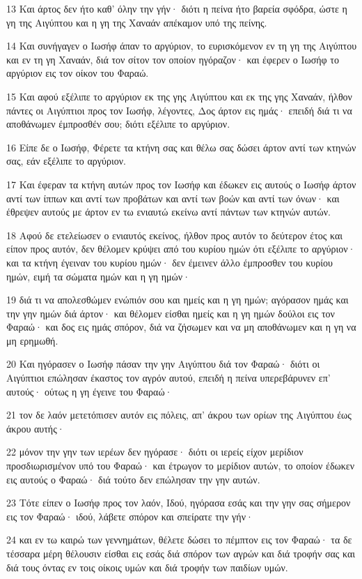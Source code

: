 \par 13 Και άρτος δεν ήτο καθ' όλην την γήν· διότι η πείνα ήτο βαρεία σφόδρα, ώστε η γη της Αιγύπτου και η γη της Χαναάν απέκαμον υπό της πείνης.
\par 14 Και συνήγαγεν ο Ιωσήφ άπαν το αργύριον, το ευρισκόμενον εν τη γη της Αιγύπτου και εν τη γη Χαναάν, διά τον σίτον τον οποίον ηγόραζον· και έφερεν ο Ιωσήφ το αργύριον εις τον οίκον του Φαραώ.
\par 15 Και αφού εξέλιπε το αργύριον εκ της γης Αιγύπτου και εκ της γης Χαναάν, ήλθον πάντες οι Αιγύπτιοι προς τον Ιωσήφ, λέγοντες, Δος άρτον εις ημάς· επειδή διά τι να αποθάνωμεν έμπροσθέν σου; διότι εξέλιπε το αργύριον.
\par 16 Είπε δε ο Ιωσήφ, Φέρετε τα κτήνη σας και θέλω σας δώσει άρτον αντί των κτηνών σας, εάν εξέλιπε το αργύριον.
\par 17 Και έφεραν τα κτήνη αυτών προς τον Ιωσήφ και έδωκεν εις αυτούς ο Ιωσήφ άρτον αντί των ίππων και αντί των προβάτων και αντί των βοών και αντί των όνων· και έθρεψεν αυτούς με άρτον εν τω ενιαυτώ εκείνω αντί πάντων των κτηνών αυτών.
\par 18 Αφού δε ετελείωσεν ο ενιαυτός εκείνος, ήλθον προς αυτόν το δεύτερον έτος και είπον προς αυτόν, δεν θέλομεν κρύψει από του κυρίου ημών ότι εξέλιπε το αργύριον· και τα κτήνη έγειναν του κυρίου ημών· δεν έμεινεν άλλο έμπροσθεν του κυρίου ημών, ειμή τα σώματα ημών και η γη ημών·
\par 19 διά τι να απολεσθώμεν ενώπιόν σου και ημείς και η γη ημών; αγόρασον ημάς και την γην ημών διά άρτον· και θέλομεν είσθαι ημείς και η γη ημών δούλοι εις τον Φαραώ· και δος εις ημάς σπόρον, διά να ζήσωμεν και να μη αποθάνωμεν και η γη να μη ερημωθή.
\par 20 Και ηγόρασεν ο Ιωσήφ πάσαν την γην Αιγύπτου διά τον Φαραώ· διότι οι Αιγύπτιοι επώλησαν έκαστος τον αγρόν αυτού, επειδή η πείνα υπερεβάρυνεν επ' αυτούς· ούτως η γη έγεινε του Φαραώ·
\par 21 τον δε λαόν μετετόπισεν αυτόν εις πόλεις, απ' άκρου των ορίων της Αιγύπτου έως άκρου αυτής·
\par 22 μόνον την γην των ιερέων δεν ηγόρασε· διότι οι ιερείς είχον μερίδιον προσδιωρισμένον υπό του Φαραώ· και έτρωγον το μερίδιον αυτών, το οποίον έδωκεν εις αυτούς ο Φαραώ· διά τούτο δεν επώλησαν την γην αυτών.
\par 23 Τότε είπεν ο Ιωσήφ προς τον λαόν, Ιδού, ηγόρασα εσάς και την γην σας σήμερον εις τον Φαραώ· ιδού, λάβετε σπόρον και σπείρατε την γήν·
\par 24 και εν τω καιρώ των γεννημάτων, θέλετε δώσει το πέμπτον εις τον Φαραώ· τα δε τέσσαρα μέρη θέλουσιν είσθαι εις εσάς διά σπόρον των αγρών και διά τροφήν σας και διά τους όντας εν τοις οίκοις υμών και διά τροφήν των παιδίων υμών.
